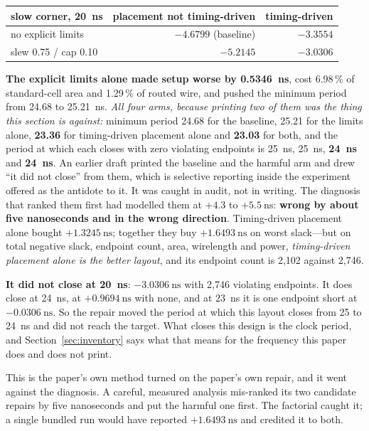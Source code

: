 \documentclass[11pt,a4paper]{article}
\begin{document}
\begin{center}
\small
\begin{tabular}{lrr}
\toprule
slow corner, \SI{20}{\nano\second} & placement not timing-driven &
timing-driven \\
\midrule
no explicit limits & $-4.6799$ (baseline) & $-3.3554$ \\
slew 0.75 / cap 0.10 & $\mathbf{-5.2145}$ & $-3.0306$ \\
\bottomrule
\end{tabular}
\end{center}

\textbf{The explicit limits alone made setup worse by
\SI{0.5346}{\nano\second}}, cost 6.98\,\% of standard-cell area and
1.29\,\% of routed wire, and pushed the minimum period from 24.68 to
\SI{25.21}{\nano\second}. \emph{All four arms, because printing two of
them was the thing this section is against:} minimum period 24.68 for
the baseline, 25.21 for the limits alone, \textbf{23.36} for
timing-driven placement alone and \textbf{23.03} for both, and the
period at which each closes with zero violating endpoints is
\SI{25}{\nano\second}, \SI{25}{\nano\second}, \textbf{\SI{24}{\nano\second}}
and \textbf{\SI{24}{\nano\second}}. An earlier draft printed the
baseline and the harmful arm and drew ``it did not close'' from them,
which is selective reporting inside the experiment offered as the
antidote to it. It was caught in audit, not in writing. The diagnosis that ranked them first had
modelled them at $+4.3$ to $+\SI{5.5}{\nano\second}$: \textbf{wrong by
about five nanoseconds and in the wrong direction}. Timing-driven
placement alone bought $+\SI{1.3245}{\nano\second}$; together they buy
$+\SI{1.6493}{\nano\second}$ on worst slack---but on total negative
slack, endpoint count, area, wirelength and power, \emph{timing-driven
placement alone is the better layout}, and its endpoint count is 2{,}102
against 2{,}746.

\textbf{It did not close at \SI{20}{\nano\second}}:
$-\SI{3.0306}{\nano\second}$ with 2{,}746 violating endpoints. It does
close at \SI{24}{\nano\second}, at $+\SI{0.9694}{\nano\second}$ with
none, and at \SI{23}{\nano\second} it is one endpoint short at
$-\SI{0.0306}{\nano\second}$. So the repair moved the period at which
this layout closes from 25 to \SI{24}{\nano\second} and did not reach
the target. What closes this design is the clock period, and
Section~\ref{sec:inventory} says what that means for the frequency this
paper does and does not print.

This is the paper's own method turned on the paper's own repair, and it
went against the diagnosis. A careful, measured analysis mis-ranked its
two candidate repairs by five nanoseconds and put the harmful one first.
The factorial caught it; a single bundled run would have reported
$+\SI{1.6493}{\nano\second}$ and credited it to both.
\end{document}
